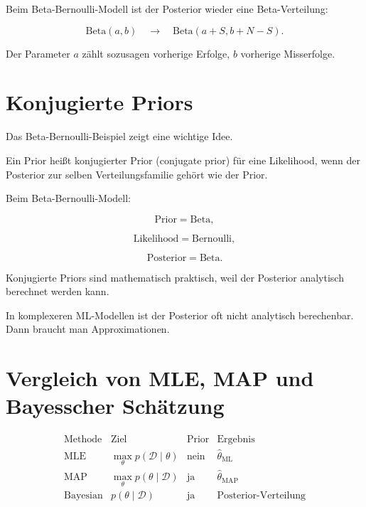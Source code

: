 \begin{conceptbox}
Beim Beta-Bernoulli-Modell ist der Posterior wieder eine Beta-Verteilung:

\[
    \mathrm{Beta}(a,b)
    \quad
    \longrightarrow
    \quad
    \mathrm{Beta}(a+S,b+N-S).
\]

Der Parameter \(a\) zählt sozusagen vorherige Erfolge, \(b\) vorherige Misserfolge.
\end{conceptbox}

\section{Konjugierte Priors}

Das Beta-Bernoulli-Beispiel zeigt eine wichtige Idee.

\begin{definitionbox}
Ein Prior heißt konjugierter Prior (conjugate prior) für eine Likelihood, wenn der Posterior zur selben Verteilungsfamilie gehört wie der Prior.
\end{definitionbox}

Beim Beta-Bernoulli-Modell:

\[
    \text{Prior}
    =
    \mathrm{Beta},
\]

\[
    \text{Likelihood}
    =
    \mathrm{Bernoulli},
\]

\[
    \text{Posterior}
    =
    \mathrm{Beta}.
\]

\begin{notebox}
Konjugierte Priors sind mathematisch praktisch, weil der Posterior analytisch berechnet werden kann.

In komplexeren ML-Modellen ist der Posterior oft nicht analytisch berechenbar.
Dann braucht man Approximationen.
\end{notebox}

\section{Vergleich von MLE, MAP und Bayesscher Schätzung}

\[
\begin{array}{c|c|c|c}
\text{Methode}
&
\text{Ziel}
&
\text{Prior}
&
\text{Ergebnis}
\\
\hline
\text{MLE}
&
\max_{\theta} p(\mathcal{D}\mid\theta)
&
\text{nein}
&
\hat{\theta}_{\mathrm{ML}}
\\
\hline
\text{MAP}
&
\max_{\theta} p(\theta\mid\mathcal{D})
&
\text{ja}
&
\hat{\theta}_{\mathrm{MAP}}
\\
\hline
\text{Bayesian}
&
p(\theta\mid\mathcal{D})
&
\text{ja}
&
\text{Posterior-Verteilung}
\end{array}
\]

